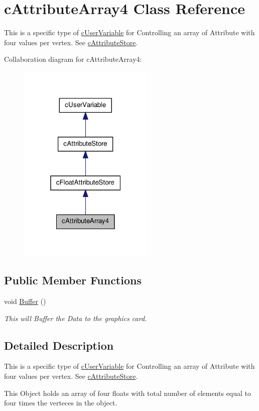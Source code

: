 \hypertarget{classc_attribute_array4}{
\section{cAttributeArray4 Class Reference}
\label{classc_attribute_array4}
}


This is a specific type of \hyperlink{classc_user_variable}{cUserVariable} for Controlling an array of Attribute with four values per vertex. See \hyperlink{classc_attribute_store}{cAttributeStore}.  




Collaboration diagram for cAttributeArray4:\nopagebreak
\begin{figure}[H]
\begin{center}
\leavevmode
\includegraphics[width=184pt]{classc_attribute_array4__coll__graph}
\end{center}
\end{figure}
\subsection*{Public Member Functions}
\begin{DoxyCompactItemize}
\item 
\hypertarget{classc_attribute_array4_a1ae92d86ffc8e252373d0d316004aafb}{
void \hyperlink{classc_attribute_array4_a1ae92d86ffc8e252373d0d316004aafb}{Buffer} ()}
\label{classc_attribute_array4_a1ae92d86ffc8e252373d0d316004aafb}

\begin{DoxyCompactList}\small\item\em This will Buffer the Data to the graphics card. \end{DoxyCompactList}\end{DoxyCompactItemize}


\subsection{Detailed Description}
This is a specific type of \hyperlink{classc_user_variable}{cUserVariable} for Controlling an array of Attribute with four values per vertex. See \hyperlink{classc_attribute_store}{cAttributeStore}. 

This Object holds an array of four floats with total number of elements equal to four times the verteces in the object. 
